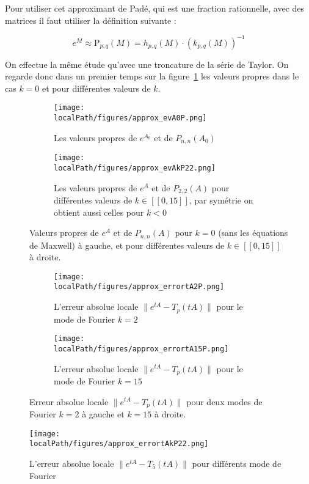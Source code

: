 Pour utiliser cet approximant de Padé, qui est une fraction rationnelle, avec des matrices il faut utiliser la définition suivante :

$$
  e^M \approx \textrm{P}_{p,q}(M) = h_{p,q}(M)\cdot\left(k_{p,q}(M)\right)^{-1}
$$

On effectue la même étude qu'avec une troncature de la série de Taylor. On regarde donc dans un premier temps sur la figure~\ref{fig:evAP22} les valeurs propres dans le cas $k=0$ et pour différentes valeurs de $k$.

\begin{figure}
  \begin{subfigure}{.5\textwidth}
    \centering
    \texttt{[image: \\localPath/figures/approx\_evA0P.png]}
    \caption{Les valeurs propres de $e^{A_0}$ et de $P_{n,n}(A_0)$}
  \end{subfigure}
  \begin{subfigure}{.5\textwidth}
    \centering
    \texttt{[image: \\localPath/figures/approx\_evAkP22.png]}
    \caption{Les valeurs propres de $e^{A}$ et de $P_{2,2}(A)$ pour différentes valeurs de $k\in[\![0,15]\!]$, par symétrie on obtient aussi celles pour $k<0$}
  \end{subfigure}
  \caption{Valeurs propres de $e^{A}$ et de $P_{n,n}(A)$ pour $k=0$ (sans les équations de Maxwell) à gauche, et pour différentes valeurs de $k\in[\![0,15]\!]$ à droite.}
  \label{fig:evAP22}
\end{figure}

\begin{figure}
  \begin{subfigure}{.5\textwidth}
    \centering
    \texttt{[image: \\localPath/figures/approx\_errortA2P.png]}
    \caption{L'erreur absolue locale $\|e^{tA}-T_p(tA)\|$ pour le mode de Fourier $k=2$}
  \end{subfigure}
  \begin{subfigure}{.5\textwidth}
    \centering
    \texttt{[image: \\localPath/figures/approx\_errortA15P.png]}
    \caption{L'erreur absolue locale $\|e^{tA}-T_p(tA)\|$ pour le mode de Fourier $k=15$}
  \end{subfigure}
  \caption{Erreur absolue locale $\|e^{tA}-T_p(tA)\|$ pour deux modes de Fourier $k=2$ à gauche et $k=15$ à droite.}
\end{figure}

\begin{figure}
  \centering
  \texttt{[image: \\localPath/figures/approx\_errortAkP22.png]}
  \caption{L'erreur absolue locale $\|e^{tA}-T_5(tA)\|$ pour différents mode de Fourier}
\end{figure}


